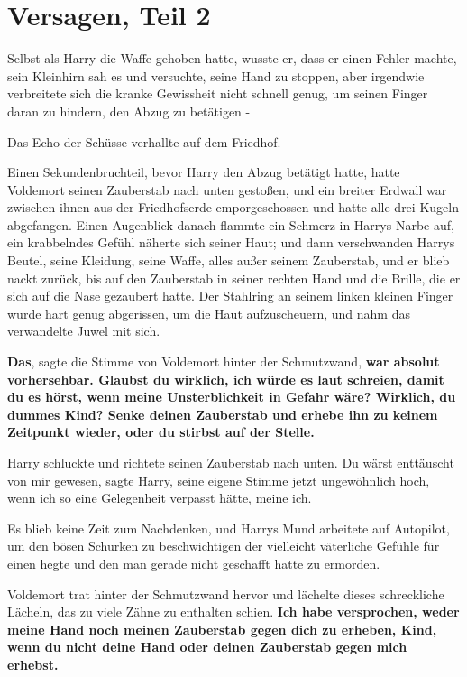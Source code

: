 \chapter{Versagen, Teil 2}

Selbst als Harry die Waffe gehoben hatte, wusste er, dass er einen Fehler
machte, sein Kleinhirn sah es und versuchte, seine Hand zu stoppen, aber
irgendwie verbreitete sich die kranke Gewissheit nicht schnell genug, um seinen
Finger daran zu hindern, den Abzug zu betätigen -

Das Echo der Schüsse verhallte auf dem Friedhof.

Einen Sekundenbruchteil, bevor Harry den Abzug betätigt hatte, hatte Voldemort
seinen Zauberstab nach unten gestoßen, und ein breiter Erdwall war zwischen
ihnen aus der Friedhofserde emporgeschossen und hatte alle drei Kugeln
abgefangen. Einen Augenblick danach flammte ein Schmerz in Harrys Narbe auf, ein
krabbelndes Gefühl näherte sich seiner Haut; und dann verschwanden Harrys
Beutel, seine Kleidung, seine Waffe, alles außer seinem Zauberstab, und er blieb
nackt zurück, bis auf den Zauberstab in seiner rechten Hand und die Brille, die
er sich auf die Nase gezaubert hatte. Der Stahlring an seinem linken kleinen
Finger wurde hart genug abgerissen, um die Haut aufzuscheuern, und nahm das
verwandelte Juwel mit sich.

\glqq{}\textbf{Das}\grqq{}, sagte die Stimme von Voldemort hinter der
Schmutzwand, \glqq{}\textbf{war absolut vorhersehbar. Glaubst du wirklich, ich
würde es laut schreien, damit du es hörst, wenn meine Unsterblichkeit in Gefahr
wäre? Wirklich, du dummes Kind? Senke deinen Zauberstab und erhebe ihn zu keinem
Zeitpunkt wieder, oder du stirbst auf der Stelle.}\grqq{}

Harry schluckte und richtete seinen Zauberstab nach unten. \glqq{}Du wärst
enttäuscht von mir gewesen\grqq{}, sagte Harry, seine eigene Stimme jetzt
ungewöhnlich hoch, \glqq{}wenn ich so eine Gelegenheit verpasst hätte, meine
ich.\grqq{}

Es blieb keine Zeit zum Nachdenken, und Harrys Mund arbeitete auf Autopilot, um
den bösen Schurken zu beschwichtigen der vielleicht väterliche Gefühle für einen
hegte und den man gerade nicht geschafft hatte zu ermorden.

Voldemort trat hinter der Schmutzwand hervor und lächelte dieses schreckliche
Lächeln, das zu viele Zähne zu enthalten schien. \glqq{}\textbf{Ich habe
versprochen, weder meine Hand noch meinen Zauberstab gegen dich zu erheben,
Kind, wenn du nicht deine Hand oder deinen Zauberstab gegen mich
erhebst.}\grqq{}

